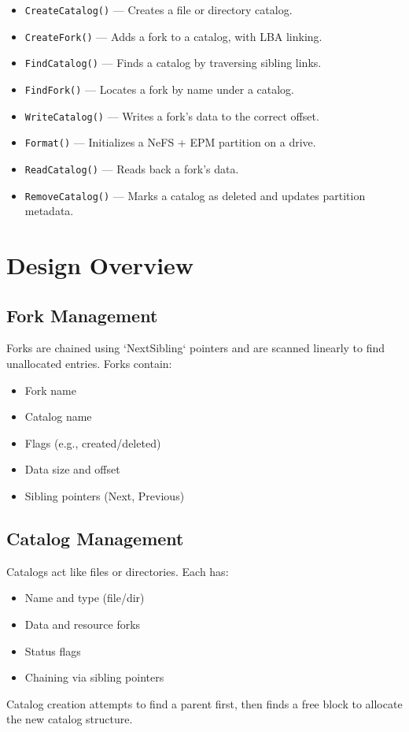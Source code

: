\documentclass{article}
\begin{document}
\begin{itemize}
  \item \texttt{CreateCatalog()} — Creates a file or directory catalog.
  \item \texttt{CreateFork()} — Adds a fork to a catalog, with LBA linking.
  \item \texttt{FindCatalog()} — Finds a catalog by traversing sibling links.
  \item \texttt{FindFork()} — Locates a fork by name under a catalog.
  \item \texttt{WriteCatalog()} — Writes a fork's data to the correct offset.
  \item \texttt{Format()} — Initializes a NeFS + EPM partition on a drive.
  \item \texttt{ReadCatalog()} — Reads back a fork's data.
  \item \texttt{RemoveCatalog()} — Marks a catalog as deleted and updates partition metadata.
\end{itemize}

\section{Design Overview}

\subsection*{Fork Management}
Forks are chained using `NextSibling` pointers and are scanned linearly to find unallocated entries. Forks contain:
\begin{itemize}
  \item Fork name
  \item Catalog name
  \item Flags (e.g., created/deleted)
  \item Data size and offset
  \item Sibling pointers (Next, Previous)
\end{itemize}

\subsection*{Catalog Management}
Catalogs act like files or directories. Each has:
\begin{itemize}
  \item Name and type (file/dir)
  \item Data and resource forks
  \item Status flags
  \item Chaining via sibling pointers
\end{itemize}
Catalog creation attempts to find a parent first, then finds a free block to allocate the new catalog structure.
\end{document}

